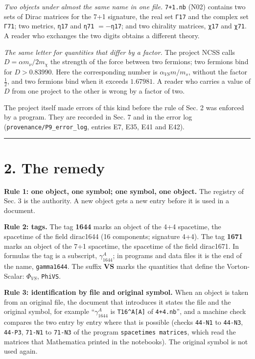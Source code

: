 \documentclass[
  10pt,
]{article}
\begin{document}
\emph{Two objects under almost the same name in one file.}
\texttt{7+1.nb} (N02) contains two sets of Dirac matrices for the 7+1
signature, the real set \texttt{Γ17} and the complex set \texttt{Γ71};
two metrics, \texttt{η17} and \texttt{η71} \(=-\)\texttt{η17}; and two
chirality matrices, \texttt{χ17} and \texttt{χ71}. A reader who
exchanges the two digits obtains a different theory.

\emph{The same letter for quantities that differ by a factor.} The
project NCSS calls \(D=\alpha m_\nu/2m_\chi\) the strength of the force
between two fermions; two fermions bind for \(D>0.83990\). Here the
corresponding number is \(\alpha_{VS}m/m_s\), without the factor
\(\tfrac12\), and two fermions bind when it exceeds \(1.67981\). A
reader who carries a value of \(D\) from one project to the other is
wrong by a factor of two.

The project itself made errors of this kind before the rule of Sec. 2
was enforced by a program. They are recorded in Sec. 7 and in the error
log (\texttt{provenance/P9\_error\_log}, entries E7, E35, E41 and E42).

\begin{center}\rule{0.5\linewidth}{0.5pt}\end{center}

\hypertarget{the-remedy}{%
\section{2. The remedy}\label{the-remedy}}

\textbf{Rule 1: one object, one symbol; one symbol, one object.} The
registry of Sec. 3 is the authority. A new object gets a new entry
before it is used in a document.

\textbf{Rule 2: tags.} The tag \textbf{1644} marks an object of the 4+4
spacetime, the spacetime of the field dirac1644 (16 components;
signature 4+4). The tag \textbf{1671} marks an object of the 7+1
spacetime, the spacetime of the field dirac1671. In formulas the tag is
a subscript, \(\gamma_{1644}^A\); in programs and data files it is the
end of the name, \texttt{gamma1644}. The suffix \textbf{VS} marks the
quantities that define the Vorton-Scalar: \(\Phi_{VS}\), \texttt{PhiVS}.

\textbf{Rule 3: identification by file and original symbol.} When an
object is taken from an original file, the document that introduces it
states the file and the original symbol, for example
``\(\gamma_{1644}^A\) is \texttt{T16\^{}A{[}A{]}} of \texttt{4+4.nb}'',
and a machine check compares the two entry by entry where that is
possible (checks \texttt{44-N1} to \texttt{44-N3}, \texttt{44-P3},
\texttt{71-N1} to \texttt{71-N3} of the program
\texttt{spacetimes\ matrices}, which read the matrices that Mathematica
printed in the notebooks). The original symbol is not used again.
\end{document}
